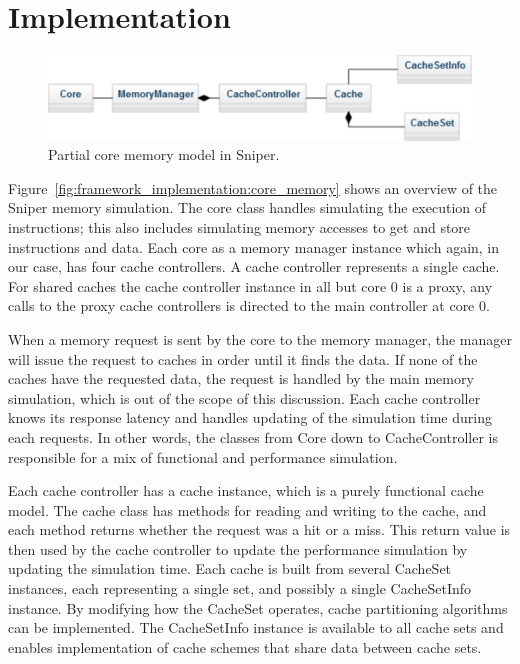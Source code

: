 \section{Implementation}
\label{sec:framework:implementation}

\begin{figure}[ht]
\centering
\includegraphics{figures/framework/functional_core_model}
\caption{Partial core memory model in Sniper.}
\label{fig:framework:implementation:core_memory}
\end{figure}

Figure~\ref{fig:framework_implementation:core_memory} shows an overview of the Sniper memory simulation.
The core class handles simulating the execution of instructions; this also includes simulating memory accesses to get and store instructions and data.
Each core as a memory manager instance which again, in our case, has four cache controllers.
A cache controller represents a single cache.
For shared caches the cache controller instance in all but core 0 is a proxy, any calls to the proxy cache controllers is directed to the main controller at core 0.

When a memory request is sent by the core to the memory manager, the manager will issue the request to caches in order until it finds the data. 
If none of the caches have the requested data, the request is handled by the main memory simulation, which is out of the scope of this discussion.
Each cache controller knows its response latency and handles updating of the simulation time during each requests.
In other words, the classes from Core down to CacheController is responsible for a mix of functional and performance simulation.

Each cache controller has a cache instance, which is a purely functional cache model.
The cache class has methods for reading and writing to the cache, and each method returns whether the request was a hit or a miss.
This return value is then used by the cache controller to update the performance simulation by updating the simulation time.
Each cache is built from several CacheSet instances, each representing a single set, and possibly a single CacheSetInfo instance.
By modifying how the CacheSet operates, cache partitioning algorithms can be implemented.
The CacheSetInfo instance is available to all cache sets and enables implementation of cache schemes that share data between cache sets.


